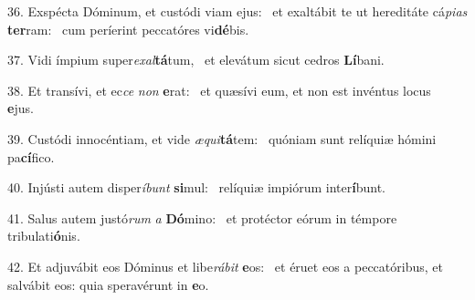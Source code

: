 36. Exspécta Dóminum, et custódi viam ejus: \dag\  et exaltábit te ut hereditáte cá\textit{pi}\textit{as} \textbf{ter}ram: \ast\  cum períerint peccatóres vi\textbf{dé}bis.\

37. Vidi ímpium super\textit{ex}\textit{al}\textbf{tá}tum, \ast\  et elevátum sicut cedros \textbf{Lí}bani.\

38. Et transívi, et ec\textit{ce} \textit{non} \textbf{e}rat: \ast\  et quæsívi eum, et non est invéntus locus \textbf{e}jus.\

39. Custódi innocéntiam, et vide \textit{æ}\textit{qui}\textbf{tá}tem: \ast\  quóniam sunt relíquiæ hómini pa\textbf{cí}fico.\

40. Injústi autem disper\textit{í}\textit{bunt} \textbf{si}mul: \ast\  relíquiæ impiórum inter\textbf{í}bunt.\

41. Salus autem justó\textit{rum} \textit{a} \textbf{Dó}mino: \ast\  et protéctor eórum in témpore tribulati\textbf{ó}nis.\

42. Et adjuvábit eos Dóminus et libe\textit{rá}\textit{bit} \textbf{e}os: \ast\  et éruet eos a peccatóribus, et salvábit eos: quia speravérunt in \textbf{e}o.\

